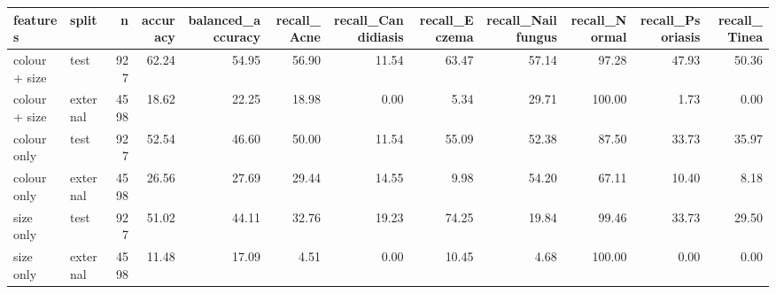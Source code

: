 \begin{tabular}{llrrrrrrrrrr}
\toprule
features & split & n & accuracy & balanced\_accuracy & recall\_Acne & recall\_Candidiasis & recall\_Eczema & recall\_Nail fungus & recall\_Normal & recall\_Psoriasis & recall\_Tinea \\
\midrule
colour + size & test & 927 & 62.24 & 54.95 & 56.90 & 11.54 & 63.47 & 57.14 & 97.28 & 47.93 & 50.36 \\
colour + size & external & 4598 & 18.62 & 22.25 & 18.98 & 0.00 & 5.34 & 29.71 & 100.00 & 1.73 & 0.00 \\
colour only & test & 927 & 52.54 & 46.60 & 50.00 & 11.54 & 55.09 & 52.38 & 87.50 & 33.73 & 35.97 \\
colour only & external & 4598 & 26.56 & 27.69 & 29.44 & 14.55 & 9.98 & 54.20 & 67.11 & 10.40 & 8.18 \\
size only & test & 927 & 51.02 & 44.11 & 32.76 & 19.23 & 74.25 & 19.84 & 99.46 & 33.73 & 29.50 \\
size only & external & 4598 & 11.48 & 17.09 & 4.51 & 0.00 & 10.45 & 4.68 & 100.00 & 0.00 & 0.00 \\
\bottomrule
\end{tabular}
